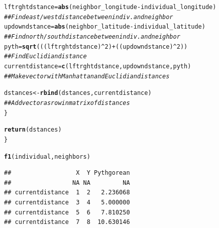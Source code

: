 \documentclass{article}\usepackage[]{graphicx}\usepackage[]{color}
\makeatletter
\newcommand{\hlnum}[1]{\textcolor[rgb]{0.686,0.059,0.569}{#1}}%
\newcommand{\hlcom}[1]{\textcolor[rgb]{0.678,0.584,0.686}{\textit{#1}}}%
\newcommand{\hlopt}[1]{\textcolor[rgb]{0,0,0}{#1}}%
\newcommand{\hlstd}[1]{\textcolor[rgb]{0.345,0.345,0.345}{#1}}%
\newcommand{\hlkwb}[1]{\textcolor[rgb]{0.69,0.353,0.396}{#1}}%
\newcommand{\hlkwd}[1]{\textcolor[rgb]{0.737,0.353,0.396}{\textbf{#1}}}%
\newenvironment{kframe}{%
 \def\at@end@of@kframe{}%
 \ifinner\ifhmode%
  \def\at@end@of@kframe{\end{minipage}}%
  \begin{minipage}{\columnwidth}%
 \fi\fi%
 \def\FrameCommand##1{\hskip\@totalleftmargin \hskip-\fboxsep
 \colorbox{shadecolor}{##1}\hskip-\fboxsep
     \hskip-\linewidth \hskip-\@totalleftmargin \hskip\columnwidth}%
 \MakeFramed {\advance\hsize-\width
   \@totalleftmargin\z@ \linewidth\hsize
   \@setminipage}}%
 {\par\unskip\endMakeFramed%
 \at@end@of@kframe}
\newenvironment{knitrout}{}{} %
\makeatother
\begin{document}
\begin{knitrout}
\begin{kframe}
\begin{alltt}
    \hlstd{lftrghtdstance} \hlkwb{=} \hlkwd{abs}\hlstd{(neighbor_longitude} \hlopt{-} \hlstd{individual_longitude)}
    \hlcom{## Find east/west distance between indiv. and neighbor}
    \hlstd{updowndstance} \hlkwb{=} \hlkwd{abs}\hlstd{(neighbor_latitude} \hlopt{-} \hlstd{individual_latitude)}
    \hlcom{## Find north/south distance between indiv. and neighbor}
    \hlstd{pyth} \hlkwb{=} \hlkwd{sqrt}\hlstd{(((lftrghtdstance)}\hlopt{^}\hlnum{2}\hlstd{)} \hlopt{+} \hlstd{((updowndstance)}\hlopt{^}\hlnum{2}\hlstd{))}
    \hlcom{## Find Euclidian distance}
    \hlstd{currentdistance} \hlkwb{=} \hlkwd{c}\hlstd{(lftrghtdstance,updowndstance,pyth)}
    \hlcom{## Make vector with Manhattan and Euclidian distances}


    \hlstd{dstances} \hlkwb{<-} \hlkwd{rbind}\hlstd{(dstances, currentdistance)}
    \hlcom{## Add vector as row in matrix of distances}
  \hlstd{\}}

  \hlkwd{return}\hlstd{(dstances)}
\hlstd{\}}

\hlkwd{f1}\hlstd{(individual, neighbors)}
\end{alltt}
\begin{verbatim}
##                  X  Y Pythgorean
##                 NA NA         NA
## currentdistance  1  2   2.236068
## currentdistance  3  4   5.000000
## currentdistance  5  6   7.810250
## currentdistance  7  8  10.630146
\end{verbatim}
\end{kframe}
\end{knitrout}
\end{document}
